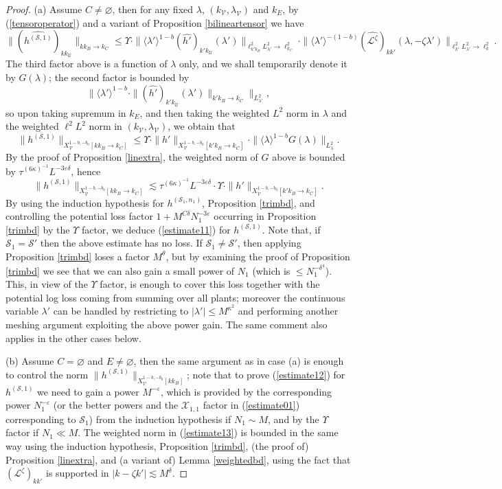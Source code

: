 \documentclass[11 pt,reqno]{amsart}
\theoremstyle{definition}
\theoremstyle{remark}
\numberwithin{equation}{section}
\newcommand{\Sc}{\mathcal{S}}
\newcommand{\Uc}{\mathcal{U}}
\newcommand{\Vc}{\mathcal{V}}
\newcommand{\Xc}{\mathcal{X}}
\newcommand{\Ls}{\mathscr{L}}
\begin{document}
{\begin{proof}
(a) Assume $C\neq\varnothing$, then for any fixed $\lambda$, $(k_\Vc,\lambda_\Vc)$ and $k_E$, by (\ref{tensoroperator}) and a variant of Proposition \ref{bilineartensor} we have
\[\|(\widehat{h^{(\Sc,1)}})_{kk_\Uc}\|_{kk_B\to k_C}\leq\Upsilon\cdot\|\langle\lambda'\rangle^{1-b}(\widehat{h'})_{k'k_\Uc}(\lambda')\|_{\ell_{k'k_B}^2L_{\lambda'}^2\to \ell_{k_C}^2}\cdot\|\langle\lambda'\rangle^{-(1-b)}(\widehat{\Ls^\zeta})_{kk'}(\lambda,-\zeta\lambda')\|_{\ell_{k'}^2L_{\lambda'}^2\to\ell_k^2}.\] The third factor above is a function of $\lambda$ only, and we shall temporarily denote it by $G(\lambda)$; the second factor is bounded by\[\big\|\langle \lambda'\rangle^{1-b}\cdot\|(\widehat{h'})_{k'k_\Uc}(\lambda')\|_{k'k_B\to k_C}\big\|_{L_{\lambda'}^2},\] so upon taking supremum in $k_E$, and then taking the weighted $L^2$ norm in $\lambda$ and the weighted $\ell^2L^2$ norm in $(k_\Vc,\lambda_\Vc)$, we obtain that
\[\|h^{(\Sc,1)}\|_{X_\Vc^{1-b,-b_0}[kk_B\to k_C]}\leq \Upsilon\cdot\|h'\|_{X_\Vc^{1-b,-b_0}[k'k_B\to k_C]}\cdot\|\langle\lambda\rangle^{1-b}G(\lambda)\|_{L_\lambda^2}.\] By the proof of Proposition \ref{linextra}, the weighted norm of $G$ above is bounded by $\tau^{(6\kappa)^{-1}}L^{-3\varepsilon\delta}$, hence
\[\|h^{(\Sc,1)}\|_{X_\Vc^{1-b,-b_0}[kk_B\to k_C]}\lesssim\tau^{(6\kappa)^{-1}}L^{-3\varepsilon\delta}\cdot\Upsilon\cdot\|h'\|_{X_\Vc^{1-b,-b_0}[k'k_B\to k_C]}.\] By using the induction hypothesis for $h^{(\Sc_1,n_1)}$, Proposition \ref{trimbd}, and controlling the potential loss factor $1+M^{C\delta}N_1^{-3\varepsilon}$ occurring in Proposition \ref{trimbd} by the $\Upsilon$ factor, we deduce (\ref{estimate11}) for $h^{(\Sc,1)}$. Note that, if $\Sc_1=\Sc'$ then the above estimate has no loss. If $\Sc_1\neq\Sc'$, then applying Proposition \ref{trimbd} loses a factor $M^\theta$, but by examining the proof of Proposition \ref{trimbd} we see that we can also gain a small power of $N_1$ (which is $\leq N_1^{-\delta^4}$). This, in view of the $\Upsilon$ factor, is enough to cover this loss together with the potential log loss coming from summing over all plants; moreover the continuous variable $\lambda'$ can be handled by restricting to $|\lambda'|\leq M^{\kappa^2}$ and performing another meshing argument exploiting the above power gain. The same comment also applies in the other cases below.

(b) Assume $C=\varnothing$ and $E\neq\varnothing$, then the same argument as in case (a) is enough to control the norm $\|h^{(\Sc,1)}\|_{X_\Vc^{1-b,-b_0}[kk_B]}$; note that to prove (\ref{estimate12}) for $h^{(\Sc,1)}$ we need to gain a power $M^{-\varepsilon}$, which is provided by the corresponding power $N_1^{-\varepsilon}$ (or the better powers and the $\Xc_{1,1}$ factor in (\ref{estimate01}) corresponding to $\Sc_1$) from the induction hypothesis if $N_1\sim M$, and by the $\Upsilon$ factor if $N_1\ll M$. The weighted norm in (\ref{estimate13}) is bounded in the same way using the induction hypothesis, Proposition \ref{trimbd}, (the proof of) Proposition \ref{linextra}, and (a variant of) Lemma \ref{weightedbd}, using the fact that $(\Ls^\zeta)_{kk'}$ is supported in $|k-\zeta k'|\lesssim M^\delta$.


\end{proof}}
\end{document}
